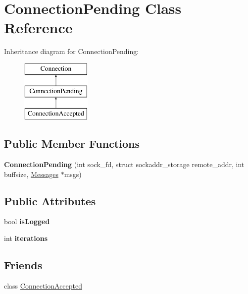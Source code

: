 \hypertarget{class_connection_pending}{
\section{ConnectionPending Class Reference}
\label{class_connection_pending}
}
Inheritance diagram for ConnectionPending:\begin{figure}[H]
\begin{center}
\leavevmode
\includegraphics[height=3.000000cm]{class_connection_pending}
\end{center}
\end{figure}
\subsection*{Public Member Functions}
\begin{DoxyCompactItemize}
\item 
\hypertarget{class_connection_pending_a6e99ee4183e24de1b4b4aa044238be12}{
{\bfseries ConnectionPending} (int sock\_\-fd, struct sockaddr\_\-storage remote\_\-addr, int buffsize, \hyperlink{class_messages}{Messages} $\ast$msgs)}
\label{class_connection_pending_a6e99ee4183e24de1b4b4aa044238be12}

\end{DoxyCompactItemize}
\subsection*{Public Attributes}
\begin{DoxyCompactItemize}
\item 
\hypertarget{class_connection_pending_ae3bab2d6eaa16cdba80a083a09b46e13}{
bool {\bfseries isLogged}}
\label{class_connection_pending_ae3bab2d6eaa16cdba80a083a09b46e13}

\item 
\hypertarget{class_connection_pending_ae4d8ca44db902d704f07a119503419d1}{
int {\bfseries iterations}}
\label{class_connection_pending_ae4d8ca44db902d704f07a119503419d1}

\end{DoxyCompactItemize}
\subsection*{Friends}
\begin{DoxyCompactItemize}
\item 
\hypertarget{class_connection_pending_a41f46ab960f4c1cc7a3e3efe66f5c8c4}{
class \hyperlink{class_connection_pending_a41f46ab960f4c1cc7a3e3efe66f5c8c4}{ConnectionAccepted}}
\label{class_connection_pending_a41f46ab960f4c1cc7a3e3efe66f5c8c4}

\end{DoxyCompactItemize}



